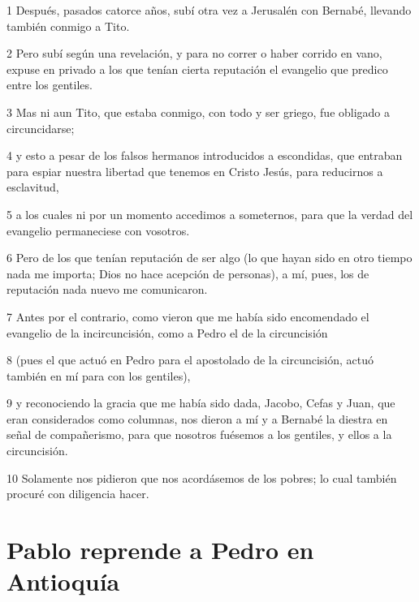 \par 1 Después, pasados catorce años, subí otra vez a Jerusalén con Bernabé, llevando también conmigo a Tito.
\par 2 Pero subí según una revelación, y para no correr o haber corrido en vano, expuse en privado a los que tenían cierta reputación el evangelio que predico entre los gentiles.
\par 3 Mas ni aun Tito, que estaba conmigo, con todo y ser griego, fue obligado a circuncidarse;
\par 4 y esto a pesar de los falsos hermanos introducidos a escondidas, que entraban para espiar nuestra libertad que tenemos en Cristo Jesús, para reducirnos a esclavitud,
\par 5 a los cuales ni por un momento accedimos a someternos, para que la verdad del evangelio permaneciese con vosotros.
\par 6 Pero de los que tenían reputación de ser algo (lo que hayan sido en otro tiempo nada me importa; Dios no hace acepción de personas), a mí, pues, los de reputación nada nuevo me comunicaron.
\par 7 Antes por el contrario, como vieron que me había sido encomendado el evangelio de la incircuncisión, como a Pedro el de la circuncisión
\par 8 (pues el que actuó en Pedro para el apostolado de la circuncisión, actuó también en mí para con los gentiles),
\par 9 y reconociendo la gracia que me había sido dada, Jacobo, Cefas y Juan, que eran considerados como columnas, nos dieron a mí y a Bernabé la diestra en señal de compañerismo, para que nosotros fuésemos a los gentiles, y ellos a la circuncisión.
\par 10 Solamente nos pidieron que nos acordásemos de los pobres; lo cual también procuré con diligencia hacer.

\section*{Pablo reprende a Pedro en Antioquía}

